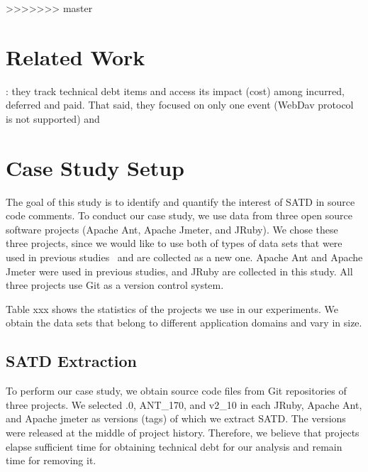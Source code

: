 \documentclass[conference]{IEEEtran}
\begin{document}


\cite{Potdar2014ICSME}
\cite{Maldonado2015MTD}
>>>>>>> master

%
\section{Related Work}

\cite{Guo2011ICSM}: they track technical debt items and access its impact (cost) among incurred, deferred and paid. That said, they focused on only one event (WebDav protocol is not supported) and 


\section{Case Study Setup} \label{sec:setup}
The goal of this study is to identify and quantify the interest of SATD in source code comments.
To conduct our case study, we use data from three open source software  projects (Apache Ant, Apache Jmeter, and JRuby). We chose these three projects, since we would like to use both of types of data sets that were used in previous studies~\cite{Maldonado2015MTD,Potdar2014ICSME} and are collected as a new one. Apache Ant and Apache Jmeter were used in previous studies, and JRuby are collected in this study. All three projects use Git as a version control system. 


Table xxx shows the statistics of the projects we use in our experiments. We obtain the data sets that belong to different application domains and vary in size.



\subsection{SATD Extraction}
To perform our case study, we obtain source code files from Git repositories of three projects. We selected {.0}, {\sc ANT\_170}, and {\sc v2\_10} in each JRuby, Apache Ant, and Apache jmeter as versions (tags) of which we extract SATD. The versions were released at the middle of project history. Therefore, we believe that projects elapse sufficient time for obtaining technical debt for our analysis and remain time for removing it.
\end{document}
